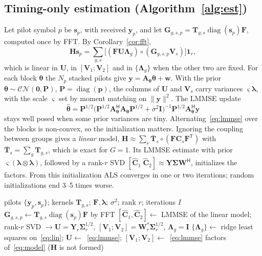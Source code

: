 \documentclass[conference,10pt]{IEEEtran}
\theoremstyle{remark}
\DeclareMathOperator{\diag}{diag}
\newcommand{\T}{\mathsf T}
\newcommand{\Hm}{\mathsf H}
\begin{document}
\subsection{Timing-only estimation (Algorithm~\ref{alg:est})}
Let pilot symbol $p$ be $\bm s_p$, with received $\bm y_p$, and let $\bm G_{g,s,p}=\bm T_{g,s}\diag(\bm s_p)\bm F$, computed
once by FFT. By Corollary~\ref{cor:fft},
\begin{equation}
\bm H\bm s_p=\sum_{g,s}\big[(\bm F\bm U\bm\Lambda_g)\circ(\bm G_{g,s,p}\bm V_s)\big]\bm 1_r,\label{eq:lin}
\end{equation}
which is linear in $\bm U$, in $[\bm V_1;\bm V_2]$ and in $\{\bm\Lambda_g\}$ when the other two are fixed. For each block
$\bm\theta$ the $N_p$ stacked pilots give $\bm y=\bm A_{\bm\theta}\bm\theta+\bm w$. With the prior
$\bm\theta\sim\mathcal{CN}(\bm 0,\bm P)$, $\bm P=\diag(\bm p)$, the columns of $\bm U$ and $\bm V_s$ carry variances
$\varsigma\bm\lambda$, with the scale $\varsigma$ set by moment matching on $\|\bm y\|^2$. The LMMSE update
\begin{equation}
\hat{\bm\theta}=\bm P^{1/2}\big(\bm P^{1/2}\bm A_{\bm\theta}^{\Hm}\bm A_{\bm\theta}\bm P^{1/2}+\sigma^2\bm I\big)^{-1}\bm P^{1/2}\bm A_{\bm\theta}^{\Hm}\bm y\label{eq:lmmse}
\end{equation}
stays well posed when some prior variances are tiny. Alternating~\eqref{eq:lmmse} over the blocks is non-convex, so the
initialization matters. Ignoring the coupling between groups gives a \emph{linear} model,
$\bm H\approx\sum_s\bar{\bm T}_s\circ(\bm F\bm C_s\bm F^{\T})$ with $\bar{\bm T}_s=\sum_g\bm T_{g,s}$, which is exact for
$G=1$. Its LMMSE estimate with prior $\varsigma(\bm\lambda\otimes\bm\lambda)$, followed by a rank-$r$ SVD
$[\hat{\bm C}_1\;\hat{\bm C}_2]\approx\bm Y\bm\Sigma\bm W^{\Hm}$, initializes the factors. From this initialization ALS
converges in one or two iterations; random initializations end 3--5 times worse.

\begin{algorithm}[t]\caption{Timing-only low-rank estimation}\label{alg:est}
\begin{algorithmic}[1]
\Require pilots $\{\bm y_p,\bm s_p\}$; kernels $\bm T_{g,s}$; $\bm F,\bm\lambda$; $\sigma^2$; rank $r$; iterations $I$
\State $\bm G_{g,s,p}\gets\bm T_{g,s}\diag(\bm s_p)\bm F$ by FFT
\State $[\hat{\bm C}_1,\hat{\bm C}_2]\gets$ LMMSE of the linear model; rank-$r$ SVD $\to\bm U=\bm Y_r\bm\Sigma_r^{1/2}$, $[\bm V_1;\bm V_2]=\bm W^{*}_r\bm\Sigma_r^{1/2}$, $\bm\Lambda_g=\bm I$
\State $\{\bm\Lambda_g\}\gets$ ridge least squares on~\eqref{eq:lin}; $\bm U\gets$~\eqref{eq:lmmse}; $[\bm V_1;\bm V_2]\gets$~\eqref{eq:lmmse}
\EndFor
\Ensure factors of~\eqref{eq:model} ($\bm H$ is not formed)
\end{algorithmic}
\end{algorithm}
\end{document}
